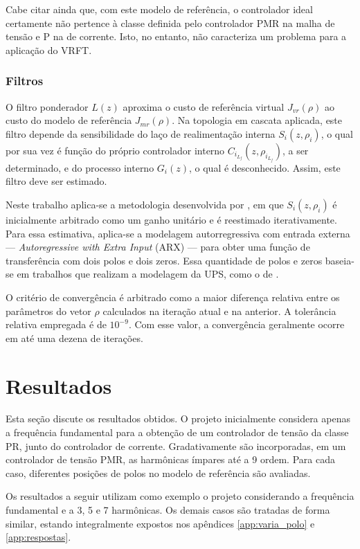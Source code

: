 \documentclass[repeatfields,oneside]{tcc}
\newcommand{\myilf}{ {i{_{L_f}}} }
\newcommand{\myC}[2][]{ C_{#1} \left( #2 \right) }
\newcommand{\myG}[2][]{ G_{#1} \left( #2 \right) }
\newcommand{\myCzrho}[1]{ \myC[#1]{z, \rho_{#1}} }
\begin{document}
Cabe citar ainda que, com este modelo de referência, o controlador ideal certamente não pertence à classe definida pelo controlador PMR na malha de tensão e P na de corrente.
Isto, no entanto, não caracteriza um problema para a aplicação do VRFT.

\subsection{Filtros}

O filtro ponderador $L(z)$ aproxima o custo de referência virtual $J_{vr}(\rho)$ ao custo do modelo de referência $J_{mr}(\rho)$.
Na topologia em cascata aplicada, este filtro depende da sensibilidade do laço de realimentação interna $S_i(z, \rho_i)$, o qual por sua vez é função do próprio controlador interno $\myCzrho{\myilf}$, a ser determinado, e do processo interno $\myG[i]{z}$, o qual é desconhecido.
Assim, este filtro deve ser estimado.

Neste trabalho aplica-se a metodologia desenvolvida por \textcite{Chrystian2020}, em que $S_i(z, \rho_i)$ é inicialmente arbitrado como um ganho unitário e é reestimado iterativamente.
Para essa estimativa, aplica-se a modelagem autorregressiva com entrada externa --- \textit{Autoregressive with Extra Input} (ARX) --- para obter uma função de transferência com dois polos e dois zeros.
Essa quantidade de polos e zeros baseia-se em trabalhos que realizam a modelagem da UPS, como o de \textcite{Pereira2014}.

O critério de convergência é arbitrado como a maior diferença relativa entre os parâmetros do vetor $\rho$ calculados na iteração atual e na anterior.
A tolerância relativa empregada é de $10^{-9}$.
Com esse valor, a convergência geralmente ocorre em até uma dezena de iterações.

\chapter{Resultados}\label{sec:resultados}

Esta seção discute os resultados obtidos.
O projeto inicialmente considera apenas a frequência fundamental para a obtenção de um controlador de tensão da classe PR, junto do controlador de corrente.
Gradativamente são incorporadas, em um controlador de tensão PMR, as harmônicas ímpares até a 9{\textordfeminine} ordem.
Para cada caso, diferentes posições de polos no modelo de referência são avaliadas.

Os resultados a seguir utilizam como exemplo o projeto considerando a frequência fundamental e a 3{\textordfeminine}, 5{\textordfeminine} e 7{\textordfeminine} harmônicas.
Os demais casos são tratadas de forma similar, estando integralmente expostos nos apêndices \ref{app:varia_polo} e \ref{app:respostas}.
\end{document}
